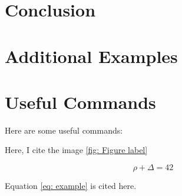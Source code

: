 \documentclass{rapportCS}
\begin{document}
\newpage

\section{Conclusion}
\lipsum[10-11]





\newpage

\section{Additional Examples}




\section{Useful Commands}

Here are some useful commands:



Here, I cite the image \ref{fig: Figure label}



\begin{equation} \label{eq: example}
\rho + \Delta = 42
\end{equation}

Equation \ref{eq: example} is cited here. 
\end{document}
